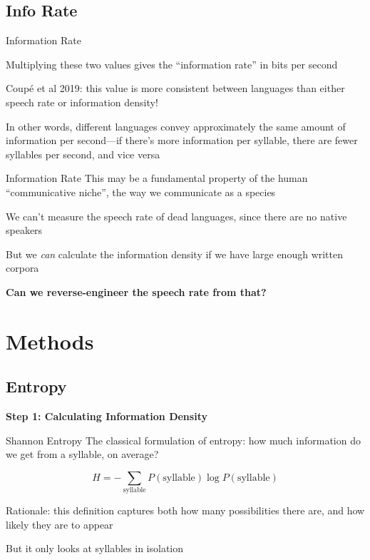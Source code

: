 \documentclass{beamer}
\begin{document}
\subsection{Info Rate}

\begin{frame}{Information Rate}

Multiplying these two values gives the ``information rate'' in bits per second

Coupé et al 2019: this value is more consistent between languages than either speech rate or information density!

In other words, different languages convey approximately the same amount of information per second---if there's more information per syllable, there are fewer syllables per second, and vice versa
\end{frame}

\begin{frame}{Information Rate}
This may be a fundamental property of the human ``communicative niche'', the way we communicate as a species

We can't measure the speech rate of dead languages, since there are no native speakers

But we \emph{can} calculate the information density if we have large enough written corpora

\textbf{Can we reverse-engineer the speech rate from that?}
\end{frame}

\section{Methods}

\subsection{Entropy}

\begin{frame}{}
\begin{center}
\textbf{\Large Step 1: Calculating Information Density}
\end{center}
\end{frame}

\begin{frame}{Shannon Entropy}
The classical formulation of entropy: how much information do we get from a syllable, on average?

\[H = - \sum_{\textrm{syllable}} P(\textrm{syllable}) \log P(\textrm{syllable})\]

Rationale: this definition captures both how many possibilities there are, and how likely they are to appear

But it only looks at syllables in isolation
\end{frame}
\end{document}
